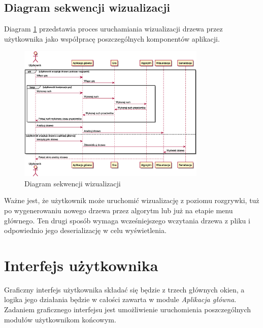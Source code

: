 \documentclass{article}
\let\oldsection\section
\renewcommand\section{\clearpage\oldsection}
\newcommand{\modulename}[1]{\textit{#1}}
\begin{document}
	\subsection{Diagram sekwencji wizualizacji}
	Diagram \ref{rys:sequencevisualise} przedstawia proces uruchamiania wizualizacji drzewa przez użytkownika jako współpracę poszczególnych komponentów aplikacji.
	\begin{figure}[h]
		\centering
		\includegraphics[width=0.8\textwidth]{visualization_sequence}
		\caption{Diagram sekwencji wizualizacji}
		\label{rys:sequencevisualise}
	\end{figure}

	\noindent Ważne jest, że użytkownik może uruchomić wizualizację z poziomu rozgrywki, tuż po wygenerowaniu nowego drzewa przez algorytm lub już na etapie menu głównego. Ten drugi sposób wymaga wcześniejszego wczytania drzewa z pliku i odpowiednio jego deserializację w celu wyświetlenia.
	
	\section{Interfejs użytkownika}
	Graficzny interfejs użytkownika składać się będzie z trzech głównych okien, a logika jego działania będzie w całości zawarta w module \modulename{Aplikacja główna}. Zadaniem graficznego interfejsu jest umożliwienie uruchomienia poszczególnych modułów użytkownikom końcowym.
	
\end{document}

